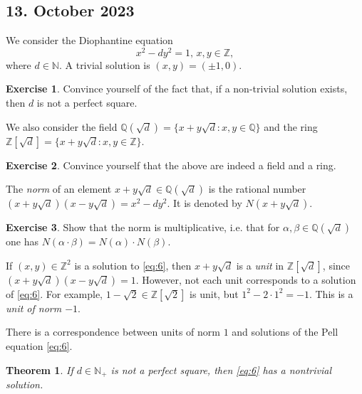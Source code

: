 \documentclass[a4paper,11pt,american]{article}
\newcommand{\N}{\mathbb{N}}
\newcommand{\Q}{\mathbb{Q}}
\newcommand{\Z}{\mathbb{Z}}
\theoremstyle{plain}
\newtheorem{theorem}{Theorem}
\theoremstyle{definition}
\newtheorem{exercise}{Exercise}
\begin{document}
\subsection*{13. October 2023}

We consider the Diophantine equation
\begin{equation}
  \label{eq:6}
  x^2 - dy^2  = 1, \, x,y \in \Z,
\end{equation}
where $d \in\N $. A trivial solution is $(x,y) = (\pm 1, 0)$.
\begin{exercise}
  \label{exe:1}
  Convince yourself of the fact that, if a non-trivial solution exists, then $d$ is not a perfect square. 
\end{exercise}

We also consider the field $\Q(\sqrt{d}) = \{x+y\sqrt{d}:x,y\in\Q \}$ and  the ring $\Z[ \sqrt{d}] = \{ x+ y \sqrt{d}:x,y \in\Z\}$.
\begin{exercise}
  \label{exe:2}
  Convince yourself that the above are indeed a field and a ring. 
\end{exercise}




The \emph{norm} of an element $x + y \sqrt{d} \in \Q(\sqrt{d})$ is the rational number $(x + y \sqrt{d}) (x - y \sqrt{d} ) = x^2 -d y^2$. It is denoted by $N(x+y\sqrt{d})$. 
\begin{exercise}
  \label{exe:3}
  Show that the norm is multiplicative, i.e. that for $\alpha,\beta \in\Q(\sqrt{d})$ one has $N(\alpha\cdot\beta) = N(\alpha)\cdot N(\beta)$. 
\end{exercise}


If $(x,y) \in\Z^2$ is a solution to \eqref{eq:6}, then $x + y \sqrt{d}$ is a \emph{unit} in $\Z[ \sqrt{d}]$, since $(x + y \sqrt{d})(x - y \sqrt{d}) =1$. However, not each unit corresponds to a solution of \eqref{eq:6}. For example, $1 - \sqrt{2} \in\Z[\sqrt{2}]$ is  unit, but $1^2 - 2 \cdot 1^2 = -1$. This is a \emph{unit of norm $-1$}.

There is a correspondence between units of norm $1$ and solutions of the Pell equation \eqref{eq:6}. 



\begin{theorem}
  \label{thr:4}
  If $d \in\N_+$ is not a perfect square, then \eqref{eq:6} has a nontrivial solution. 
\end{theorem}
\end{document}
